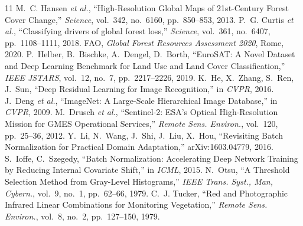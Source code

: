 \documentclass[journal]{IEEEtran}
\begin{document}
\begin{thebibliography}{11}
 M.~C. Hansen \emph{et al.}, ``High-Resolution Global Maps of 21st-Century Forest Cover Change,'' \emph{Science}, vol.~342, no.~6160, pp.~850--853, 2013.
 P.~G. Curtis \emph{et al.}, ``Classifying drivers of global forest loss,'' \emph{Science}, vol.~361, no.~6407, pp.~1108--1111, 2018.
 FAO, \emph{Global Forest Resources Assessment 2020}, Rome, 2020.
 P.~Helber, B.~Bischke, A.~Dengel, D.~Borth, ``EuroSAT: A Novel Dataset and Deep Learning Benchmark for Land Use and Land Cover Classification,'' \emph{IEEE JSTARS}, vol.~12, no.~7, pp.~2217--2226, 2019.
 K.~He, X.~Zhang, S.~Ren, J.~Sun, ``Deep Residual Learning for Image Recognition,'' in \emph{CVPR}, 2016.
 J.~Deng \emph{et al.}, ``ImageNet: A Large-Scale Hierarchical Image Database,'' in \emph{CVPR}, 2009.
 M.~Drusch \emph{et al.}, ``Sentinel-2: ESA's Optical High-Resolution Mission for GMES Operational Services,'' \emph{Remote Sens. Environ.}, vol.~120, pp.~25--36, 2012.
 Y.~Li, N.~Wang, J.~Shi, J.~Liu, X.~Hou, ``Revisiting Batch Normalization for Practical Domain Adaptation,'' arXiv:1603.04779, 2016.
 S.~Ioffe, C.~Szegedy, ``Batch Normalization: Accelerating Deep Network Training by Reducing Internal Covariate Shift,'' in \emph{ICML}, 2015.
 N.~Otsu, ``A Threshold Selection Method from Gray-Level Histograms,'' \emph{IEEE Trans. Syst., Man, Cybern.}, vol.~9, no.~1, pp.~62--66, 1979.
 C.~J. Tucker, ``Red and Photographic Infrared Linear Combinations for Monitoring Vegetation,'' \emph{Remote Sens. Environ.}, vol.~8, no.~2, pp.~127--150, 1979.
\end{thebibliography}
\end{document}
